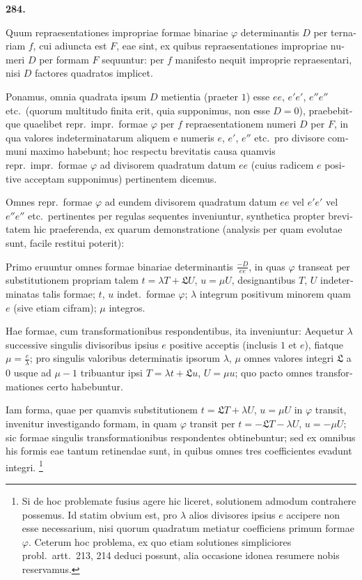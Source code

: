 \documentclass[12pt,a4paper]{article}
\theoremstyle{plain}
\theoremstyle{definition}
\theoremstyle{remark}
\begin{document}
\begin{otherlanguage}{latin}

\textbf{284.}

Quum repraesentationes impropriae formae binariae $\varphi$ determinantis $D$ per ternariam $f$, cui adiuncta est $F$, eae sint, ex quibus repraesentationes impropriae numeri $D$ per formam $F$ sequuntur: per $f$ manifesto nequit improprie repraesentari, nisi $D$ factores quadratos implicet.

Ponamus, omnia quadrata ipsum $D$ metientia (praeter $1$) esse $ee$, $e'e'$, $e''e''$ etc.\ (quorum multitudo finita erit, quia supponimus, non esse $D = 0$), praebebitque quaelibet repr.\ impr.\ formae $\varphi$ per $f$ repraesentationem numeri $D$ per $F$, in qua valores indeterminatarum aliquem e numeris $e$, $e'$, $e''$ etc.\ pro divisore communi maximo habebunt; hoc respectu brevitatis causa quamvis repr.\ impr.\ formae $\varphi$ ad divisorem quadratum datum $ee$ (cuius radicem $e$ positive acceptam supponimus) pertinentem dicemus.

Omnes repr.\ formae $\varphi$ ad eundem divisorem quadratum datum $ee$ vel $e'e'$ vel $e''e''$ etc.\ pertinentes per regulas sequentes inveniuntur, synthetica propter brevitatem hic praeferenda, ex quarum demonstratione (analysis per quam evolutae sunt, facile restitui poterit):

Primo eruuntur omnes formae binariae determinantis $\frac{-D}{ee}$, in quas $\varphi$ transeat per substitutionem propriam talem $t = \lambda T + \mathfrak{L} U$, $u = \mu U$, designantibus $T$, $U$ indeterminatas talis formae; $t$, $u$ indet.\ formae $\varphi$; $\lambda$ integrum positivum minorem quam $e$ (sive etiam cifram); $\mu$ integros.

Hae formae, cum transformationibus respondentibus, ita inveniuntur: Aequetur $\lambda$ successive singulis divisoribus ipsius $e$ positive acceptis (inclusis $1$ et $e$), fiatque $\mu = \frac{e}{\lambda}$; pro singulis valoribus determinatis ipsorum $\lambda$, $\mu$ omnes valores integri $\mathfrak{L}$ a $0$ usque ad $\mu - 1$ tribuantur ipsi $T = \lambda t + \mathfrak{L} u$, $U = \mu u$; quo pacto omnes transformationes certo habebuntur.

Iam forma, quae per quamvis substitutionem $t = \mathfrak{L} T + \lambda U$, $u = \mu U$ in $\varphi$ transit, invenitur investigando formam, in quam $\varphi$ transit per $t = -\mathfrak{L} T - \lambda U$, $u = -\mu U$; sic formae singulis transformationibus respondentes obtinebuntur; sed ex omnibus his formis eae tantum retinendae sunt, in quibus omnes tres coefficientes evadunt integri.
\footnote{Si de hoc problemate fusius agere hic liceret, solutionem admodum contrahere possemus. Id statim obvium est, pro $\lambda$ alios divisores ipsius $e$ accipere non esse necessarium, nisi quorum quadratum metiatur coefficiens primum formae $\varphi$. Ceterum hoc problema, ex quo etiam solutiones simpliciores probl.\ artt.\ 213, 214 deduci possunt, alia occasione idonea resumere nobis reservamus.}


\end{otherlanguage}
\end{document}
